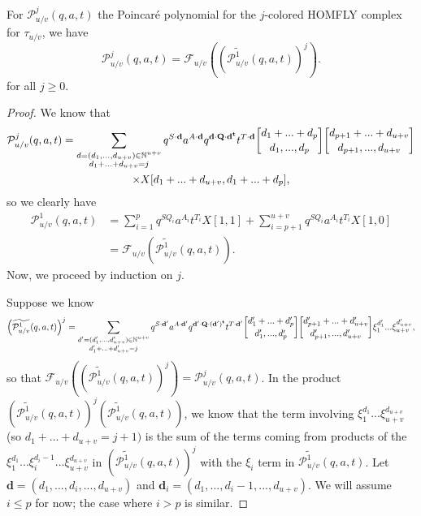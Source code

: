 \documentclass[10pt,a4paper]{amsart}
\begin{document}
\begin{theoremN}
    For $\mathcal{P}_{u/v}^j(q,a,t)$ the Poincar\'e polynomial for the $j$-colored HOMFLY complex for $\tau_{u/v}$, we have
    \begin{equation}
        \mathcal{P}_{u/v}^j(q,a,t)=\mathcal{F}_{u/v}\left(\left(\widetilde{\mathcal{P}_{u/v}^1}(q,a,t)\right)^j\right).
    \end{equation}
    for all $j\geq 0$.   
\end{theoremN}

\begin{proof}
    We know that 
    \begin{multline}
        \mathcal{P}_{u/v}^j(q,a,t)=\sum_{\substack{\textbf{d}=(d_1,...,d_{u+v})\in \mathbb{N}^{u+v}\\d_1+...+d_{u+v}=j}}q^{S\cdot\bf{d} }a^{A\cdot \bf{d}}q^{\bf{d}\cdot Q\cdot \bf{d}^t} t^{T\cdot\bf{d}} {d_1+...+d_p\brack d_1,...,d_p}{d_{p+1}+...+d_{u+v}\brack d_{p+1},...,d_{u+v}}\\ \times X[d_1+...+d_{u+v},d_1+...+d_p],
    \end{multline}
    so we clearly have
    \begin{align*}
    \mathcal{P}_{u/v}^1(q,a,t) & = \sum_{i=1}^p q^{SQ_i}a^{A_i}t^{T_i}X[1,1]+\sum_{i=p+1}^{u+v} q^{SQ_i}a^{A_i}t^{T_i}X[1,0] \\
    &= \mathcal{F}_{u/v}\left(\widetilde{\mathcal{P}_{u/v}^1}(q,a,t)\right).
    \end{align*}
    Now, we proceed by induction on $j$.

    Suppose we know 
    \[
        \left(\widetilde{\mathcal{P}_{u/v}^1}(q,a,t)\right)^j=\sum_{\substack{\textbf{d}'=(d_1',...,d_{u+v}')\in \mathbb{N}^{u+v}\\d_1'+...+d_{u+v}'=j}}q^{S\cdot\bf{d}' }a^{A\cdot \bf{d}'}q^{\bf{d}'\cdot Q\cdot (\bf{d}')^t} t^{T\cdot\bf{d}'} {d_1'+...+d_p'\brack d_1',...,d_p'}{d_{p+1}'+...+d_{u+v}'\brack d_{p+1}',...,d_{u+v}'}\xi_1^{d_1'}...\xi_{u+v}^{d_{u+v}'},
    \]
    so that $\mathcal{F}_{u/v}\left(\left(\widetilde{\mathcal{P}_{u/v}^1}(q,a,t)\right)^j\right)=\mathcal{P}_{u/v}^j(q,a,t)$. In the product $\left(\widetilde{\mathcal{P}_{u/v}^1}(q,a,t)\right)^j\left(\widetilde{\mathcal{P}_{u/v}^1}(q,a,t)\right)$, we know that the term involving $\xi_1^{d_1}...\xi_{u+v}^{d_{u+v}}$ (so $d_1+...+d_{u+v}=j+1)$ is the sum of the terms coming from products of the $\xi_1^{d_1}...\xi_i^{d_i-1}...\xi_{u+v}^{d_{u+v}}$ in $\left(\widetilde{\mathcal{P}_{u/v}^1}(q,a,t)\right)^j$ with the $\xi_i$ term in $\widetilde{\mathcal{P}_{u/v}^1}(q,a,t)$. Let $\textbf{d}=(d_1,...,d_i,...,d_{u+v})$ and $\textbf{d}_i=(d_1,...,d_i-1,...,d_{u+v})$. We will assume $i\leq p$ for now; the case where $i>p$ is similar.


\end{proof}
\end{document}
